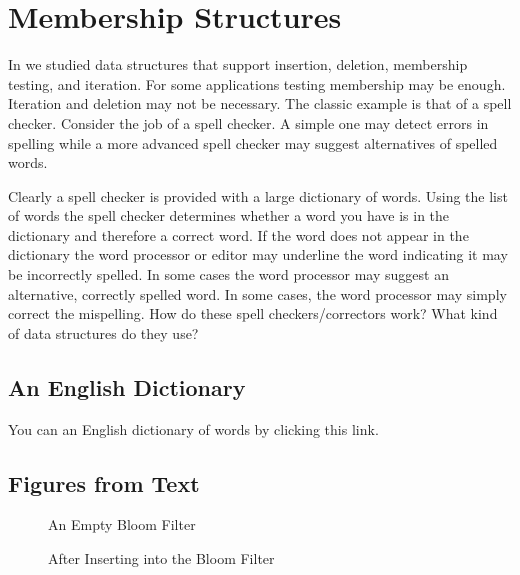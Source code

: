 \documentclass[letterpaper,10pt,english]{sphinxmanual}
\begin{document}
\chapter{Membership Structures}
\label{\detokenize{chap11/chap11:membership-structures}}\label{\detokenize{chap11/chap11:chap11}}\label{\detokenize{chap11/chap11::doc}}
In {\hyperref[\detokenize{chap5/chap5:setsmaps}]{}} we studied data structures that support insertion, deletion, membership testing, and iteration. For some applications testing membership may be enough. Iteration and deletion may not be necessary. The classic example is that of a spell checker. Consider the job of a spell checker. A simple one may detect errors in spelling while a more advanced spell checker may suggest alternatives of  spelled words.

Clearly a spell checker is provided with a large dictionary of words. Using the list of words the spell checker determines whether a word you have is in the dictionary and therefore a correct word. If the word does not appear in the dictionary the word processor or editor may underline the word indicating it may be incorrectly spelled. In some cases the word processor may suggest an alternative, correctly spelled word. In some cases, the word processor may simply correct the mispelling. How do these spell checkers/correctors work? What kind of data structures do they use?


\section{An English Dictionary}
\label{\detokenize{chap11/chap11:an-english-dictionary}}
You can  an English dictionary of words by clicking this link.


\section{Figures from Text}
\label{\detokenize{chap11/chap11:figures-from-text}}
\begin{figure}[htbp]
\centering
\capstart

\noindent{}
\caption{An Empty Bloom Filter}\label{\detokenize{chap11/chap11:id1}}\end{figure}

\begin{figure}[htbp]
\centering
\capstart

\noindent{}
\caption{After Inserting  into the Bloom Filter}\label{\detokenize{chap11/chap11:id2}}\end{figure}
\end{document}
